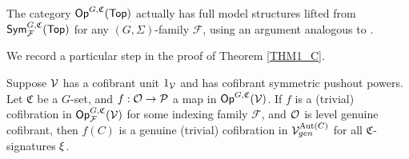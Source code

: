 \documentclass[a4paper,10pt
,draft
]{article}%
\renewcommand{\F}{\mathcal F}
\renewcommand{\1}{\eta}%
\begin{document}
\begin{remark}
      \label{TOP_FULL_REM}
      The category $\mathsf{Op}^{G,\mathfrak C}(\mathsf{Top})$ actually has full model structures lifted from $\Sym^{G, \mathfrak C}_\F(\Top)$
      for any $(G, \Sigma)$-family $\F$,
      using an argument analogous to \cite[Thm. 3.1]{GW}.
\end{remark}

We record a particular step in the proof of Theorem \ref{THM1_C}.
\begin{corollary}
      \label{LGC_COR}
      Suppose $\mathcal V$ has a cofibrant unit $1_{\mathcal V}$ and has cofibrant symmetric pushout powers.
      Let $\mathfrak C$ be a $G$-set, and $f: \mathcal{O} \to \mathcal{P}$ a map in $\mathsf{Op}^{G,\mathfrak C}(\mathcal V)$.
      If $f$ is a (trivial) cofibration in $\Op^{G, \mathfrak C}_\F(\V)$ for some indexing family $\F$,
      and $\mathcal{O}$ is level genuine cofibrant, then
      $f(C)$ is a genuine (trivial) cofibration in $\mathcal V^{\operatorname{Aut}(C)}_{gen}$ for all $\mathfrak C$-signatures $\xi$.
\end{corollary}
      
\end{document}
